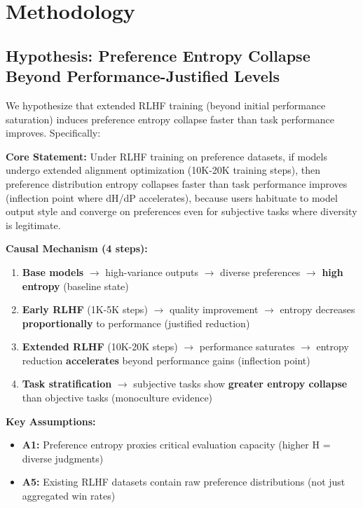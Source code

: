 \section{Methodology}

\subsection{Hypothesis: Preference Entropy Collapse Beyond Performance-Justified Levels}

We hypothesize that extended RLHF training (beyond initial performance saturation) induces preference entropy collapse faster than task performance improves. Specifically:

\textbf{Core Statement:} Under RLHF training on preference datasets, if models undergo extended alignment optimization (10K-20K training steps), then preference distribution entropy collapses faster than task performance improves (inflection point where dH/dP accelerates), because users habituate to model output style and converge on preferences even for subjective tasks where diversity is legitimate.

\textbf{Causal Mechanism (4 steps):}
\begin{enumerate}
\item \textbf{Base models} $\rightarrow$ high-variance outputs $\rightarrow$ diverse preferences $\rightarrow$ \textbf{high entropy} (baseline state)
\item \textbf{Early RLHF} (1K-5K steps) $\rightarrow$ quality improvement $\rightarrow$ entropy decreases \textbf{proportionally} to performance (justified reduction)
\item \textbf{Extended RLHF} (10K-20K steps) $\rightarrow$ performance saturates $\rightarrow$ entropy reduction \textbf{accelerates} beyond performance gains (inflection point)
\item \textbf{Task stratification} $\rightarrow$ subjective tasks show \textbf{greater entropy collapse} than objective tasks (monoculture evidence)
\end{enumerate}

\textbf{Key Assumptions:}
\begin{itemize}
\item \textbf{A1:} Preference entropy proxies critical evaluation capacity (higher H = diverse judgments)
\item \textbf{A5:} Existing RLHF datasets contain raw preference distributions (not just aggregated win rates)
\end{itemize}

